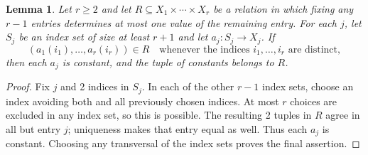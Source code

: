 \documentclass[10pt]{article}
\numberwithin{equation}{section}
\newtheorem{lemma}[lemma]{Lemma}\aliascntresetthe{lemma}
\theoremstyle{definition}
\begin{document}
\begin{lemma}\label{lem:transversal-rigidity}
Let $r\ge2$ and let $R\subseteq X_1\times\cdots\times X_r$ be a relation in which fixing any $r-1$ entries determines at most one value of the remaining entry. For each $j$, let $S_j$ be an index set of size at least $r+1$ and let $a_j\colon S_j\to X_j$. If
\[
 (a_1(i_1),\ldots,a_r(i_r))\in R
 \quad\text{whenever the indices }i_1,\ldots,i_r\text{ are distinct},
\]
then each $a_j$ is constant, and the tuple of constants belongs to $R$.
\end{lemma}
\begin{proof}
Fix $j$ and 2 indices in $S_j$. In each of the other $r-1$ index sets, choose an index avoiding both and all previously chosen indices. At most $r$ choices are excluded in any index set, so this is possible. The resulting 2 tuples in $R$ agree in all but entry $j$; uniqueness makes that entry equal as well. Thus each $a_j$ is constant. Choosing any transversal of the index sets proves the final assertion.
\end{proof}
\end{document}
